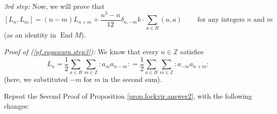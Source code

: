 \documentclass[etingof-lie.tex]{subfiles}
\begin{document}
\textit{3rd step:} Now, we will prove that%
\begin{equation}
\left[  L_{n},L_{m}\right]  =\left(  n-m\right)  L_{n+m}+\dfrac{n^{3}-n}%
{12}\delta_{n,-m}k\cdot\sum\limits_{a\in B}\left(  a,a\right)
\ \ \ \ \ \ \ \ \ \ \text{for any integers }n\text{ and }m
\label{pf.sugawara.step3}%
\end{equation}
(as an identity in $\operatorname*{End}M$).

\textit{Proof of (\ref{pf.sugawara.step3}):} We know that every $n\in
\mathbb{Z}$ satisfies%
\begin{equation}
L_{n}=\dfrac{1}{2}\sum\limits_{a\in B}\sum\limits_{m\in\mathbb{Z}}\left.
:a_{m}a_{n-m}:\right.  =\dfrac{1}{2}\sum\limits_{a\in B}\sum\limits_{m\in
\mathbb{Z}}\left.  :a_{-m}a_{n+m}:\right.  \label{pf.sugawara.step3.pf.1}%
\end{equation}
(here, we substituted $-m$ for $m$ in the second sum).

Repeat the Second Proof of Proposition \ref{prop.fockvir.answer2}, with the
following changes:
\end{document}
